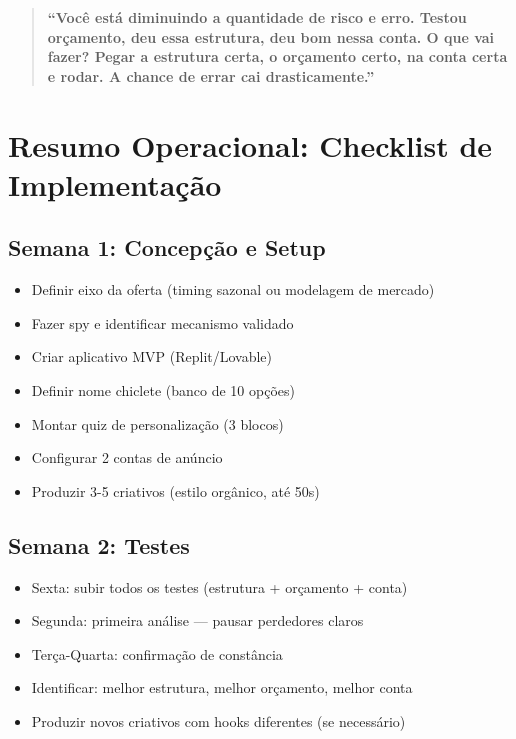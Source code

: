 \documentclass[12pt, a4paper]{article}
\begin{document}
\begin{quote}
\textcolor{primaryColor}{\textbf{``Você está diminuindo a quantidade de risco e erro. Testou orçamento, deu essa estrutura, deu bom nessa conta. O que vai fazer? Pegar a estrutura certa, o orçamento certo, na conta certa e rodar. A chance de errar cai drasticamente.''}}
\end{quote}

\needspace{10cm}

\section{Resumo Operacional: Checklist de Implementação}

\subsection{Semana 1: Concepção e Setup}

\begin{itemize}[label=$\square$]
    \item Definir eixo da oferta (timing sazonal ou modelagem de mercado)
    \item Fazer spy e identificar mecanismo validado
    \item Criar aplicativo MVP (Replit/Lovable)
    \item Definir nome chiclete (banco de 10 opções)
    \item Montar quiz de personalização (3 blocos)
    \item Configurar 2 contas de anúncio
    \item Produzir 3-5 criativos (estilo orgânico, até 50s)
\end{itemize}

\subsection{Semana 2: Testes}

\begin{itemize}[label=$\square$]
    \item Sexta: subir todos os testes (estrutura + orçamento + conta)
    \item Segunda: primeira análise --- pausar perdedores claros
    \item Terça-Quarta: confirmação de constância
    \item Identificar: melhor estrutura, melhor orçamento, melhor conta
    \item Produzir novos criativos com hooks diferentes (se necessário)
\end{itemize}
\end{document}
